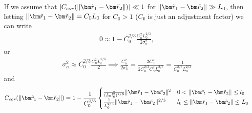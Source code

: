 If we assume that $|C_{cor}(\|\vect{\dim{r}}_1-\vect{\dim{r}}_{2}\|)| \ll 1$ for $ \|\vect{\dim{r}}_1-\vect{\dim{r}}_{2}\| \gg L_0$, 
then letting $\|\vect{\dim{r}}_1-\vect{\dim{r}}_{2}\| = C_0 L_0$ for $C_0 > 1$ ($C_0$ is just an adjustment factor) we can write
\begin{equation}
\begin{split}
  0 \approx 1 - C_0^{2/3} \frac{C_n^2 L_0^{2/3}}{2\sigma_n^2},
\end{split}
\end{equation}
or 
\begin{equation}
\begin{split}
  \sigma_n^2 \approx  C_0^{2/3} \frac{C_n^2 L_0^{2/3}}{2} \implies \frac{C_n^2}{2\sigma_n^2} 
  =  \frac{2 C_n^2}{2 C_0^{2/3} C_n^{2} L_0^{2/3}} = \frac{1}{ C_0^{2/3} L_0^{2/3}} 
\end{split}
\end{equation}
and
\begin{equation}
  C_{cor}(\|\vect{\dim{r}}_1-\vect{\dim{r}}_{2}\|) = 1 - \frac{1}{C_0^{2/3}}
    \begin{cases}
        \frac{1}{(L_0l_{0}^2)^{2/3}}\|\vect{\dim{r}}_1-\vect{\dim{r}}_{2}\|^{2} & 0 < \|\vect{\dim{r}}_1-\vect{\dim{r}}_{2}\| \leq l_{0} \\
        \frac{1}{L_0^{2/3}} \|\vect{\dim{r}}_1-\vect{\dim{r}}_{2}\|^{2/3} &  l_{0}  \leq \|\vect{\dim{r}}_1-\vect{\dim{r}}_{2}\| \leq  L_{0}  \\
   \end{cases}
\end{equation}

